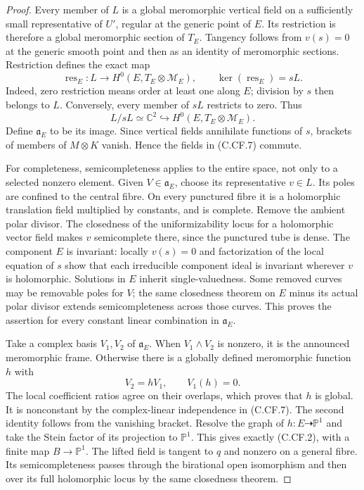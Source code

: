 \begin{proof}
Every member of $L$ is a global meromorphic vertical field
on a sufficiently small representative of $U'$, regular at
the generic point of $E$. Its restriction is therefore a
global meromorphic section of $T_E$. Tangency follows from
$v(s)=0$ at the generic smooth point and then as an identity
of meromorphic sections. Restriction defines the exact map
\[
 \operatorname{res}_E:L\longrightarrow
 H^0(E,T_E\otimes\mathcal M_E),
 \qquad
 \ker(\operatorname{res}_E)=sL.
 \tag{C.CF.6}
\]
Indeed, zero restriction means order at least one along $E$;
division by $s$ then belongs to $L$. Conversely, every member
of $sL$ restricts to zero. Thus
\[
                  L/sL\simeq\mathbb C^2
                    \hookrightarrow
                  H^0(E,T_E\otimes\mathcal M_E).
 \tag{C.CF.7}
\]
Define $\mathfrak a_E$ to be its image. Since vertical fields
annihilate functions of $s$, brackets of members of
$M\otimes K$ vanish. Hence the fields in (C.CF.7) commute.

For completeness, semicompleteness applies to the entire
space, not only to a selected nonzero element. Given
$V\in\mathfrak a_E$, choose its representative $v\in L$.
Its poles are confined to the central fibre. On every
punctured fibre it is a holomorphic translation field
multiplied by constants, and is complete. Remove the
ambient polar divisor. The closedness of the
uniformizability locus for a holomorphic vector field
\cite[Theorem~3.3]{Guillot2024} makes $v$ semicomplete
there, since the punctured tube is dense. The component
$E$ is invariant: locally $v(s)=0$ and factorization of
the local equation of $s$ show that each irreducible
component ideal is invariant wherever $v$ is holomorphic.
Solutions in $E$ inherit single-valuedness. Some removed
curves may be removable poles for $V$; the same closedness
theorem on $E$ minus its actual polar divisor extends
semicompleteness across those curves. This proves the
assertion for every constant linear combination in
$\mathfrak a_E$.

Take a complex basis $V_1,V_2$ of $\mathfrak a_E$.
When $V_1\wedge V_2$ is nonzero, it is the announced
meromorphic frame. Otherwise there is a globally defined
meromorphic function $h$ with
\[
                  V_2=hV_1,
                  \qquad V_1(h)=0.
 \tag{C.CF.8}
\]
The local coefficient ratios agree on their overlaps,
which proves that $h$ is global. It is nonconstant by
the complex-linear independence in (C.CF.7). The second
identity follows from the vanishing bracket.
Resolve the graph of $h:E\dashrightarrow\mathbb P^1$
and take the Stein factor of its projection to
$\mathbb P^1$. This gives exactly (C.CF.2), with a
finite map $B\to\mathbb P^1$. The lifted field is
tangent to $q$ and nonzero on a general fibre.
Its semicompleteness passes through the birational
open isomorphism and then over its full holomorphic
locus by the same closedness theorem.


\end{proof}
